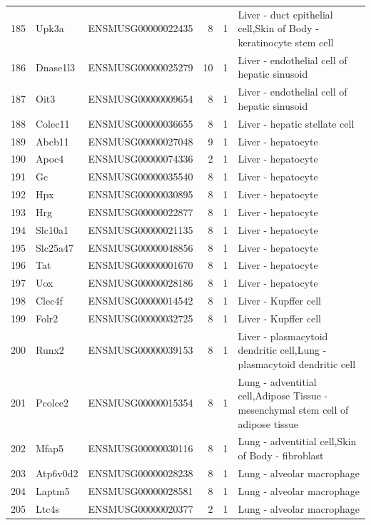 \begin{table}[ht]
{\begin{tabular}{lllrrl}
        185 & Upk3a & ENSMUSG00000022435 & 8 & 1 & Liver - duct epithelial cell,Skin of Body - keratinocyte stem cell \\
        186 & Dnase1l3 & ENSMUSG00000025279 & 10 & 1 & Liver - endothelial cell of hepatic sinusoid \\
        187 & Oit3 & ENSMUSG00000009654 & 8 & 1 & Liver - endothelial cell of hepatic sinusoid \\
        188 & Colec11 & ENSMUSG00000036655 & 8 & 1 & Liver - hepatic stellate cell \\
        189 & Abcb11 & ENSMUSG00000027048 & 9 & 1 & Liver - hepatocyte \\
        190 & Apoc4 & ENSMUSG00000074336 & 2 & 1 & Liver - hepatocyte \\
        191 & Gc & ENSMUSG00000035540 & 8 & 1 & Liver - hepatocyte \\
        192 & Hpx & ENSMUSG00000030895 & 8 & 1 & Liver - hepatocyte \\
        193 & Hrg & ENSMUSG00000022877 & 8 & 1 & Liver - hepatocyte \\
        194 & Slc10a1 & ENSMUSG00000021135 & 8 & 1 & Liver - hepatocyte \\
        195 & Slc25a47 & ENSMUSG00000048856 & 8 & 1 & Liver - hepatocyte \\
        196 & Tat & ENSMUSG00000001670 & 8 & 1 & Liver - hepatocyte \\
        197 & Uox & ENSMUSG00000028186 & 8 & 1 & Liver - hepatocyte \\
        198 & Clec4f & ENSMUSG00000014542 & 8 & 1 & Liver - Kupffer cell \\
        199 & Folr2 & ENSMUSG00000032725 & 8 & 1 & Liver - Kupffer cell \\
        200 & Runx2 & ENSMUSG00000039153 & 8 & 1 & Liver - plasmacytoid dendritic cell,Lung - plasmacytoid dendritic cell \\
        201 & Pcolce2 & ENSMUSG00000015354 & 8 & 1 & Lung - adventitial cell,Adipose Tissue - mesenchymal stem cell of adipose tissue \\
        202 & Mfap5 & ENSMUSG00000030116 & 8 & 1 & Lung - adventitial cell,Skin of Body - fibroblast \\
        203 & Atp6v0d2 & ENSMUSG00000028238 & 8 & 1 & Lung - alveolar macrophage \\
        204 & Laptm5 & ENSMUSG00000028581 & 8 & 1 & Lung - alveolar macrophage \\
        205 & Ltc4s & ENSMUSG00000020377 & 2 & 1 & Lung - alveolar macrophage \\

\end{tabular}}
\end{table}
